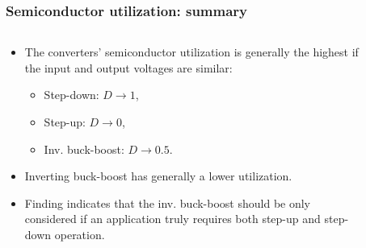 \begin{frame}
    \frametitle{Semiconductor utilization: summary}
    \begin{columns}
        \begin{column}{0.4\textwidth}
             \begin{itemize}
                \item<2-> The converters' semiconductor utilization is generally the highest if the input and output voltages are similar:
                \begin{itemize}
                    \item<2-> Step-down: $D\rightarrow1$,
                    \item<3-> Step-up: $D\rightarrow0$,
                    \item<4-> Inv. buck-boost: $D\rightarrow0.5$.
                \end{itemize}
                \item<5-> Inverting buck-boost has generally a lower utilization.
                \item<6-> Finding indicates that the inv. buck-boost  should be only considered if an application truly requires both step-up and step-down operation.
             \end{itemize}
        \end{column}
        \begin{column}{0.6\textwidth}
            \begin{figure}
\end{figure}
\end{column}
\end{columns}
\end{frame}
